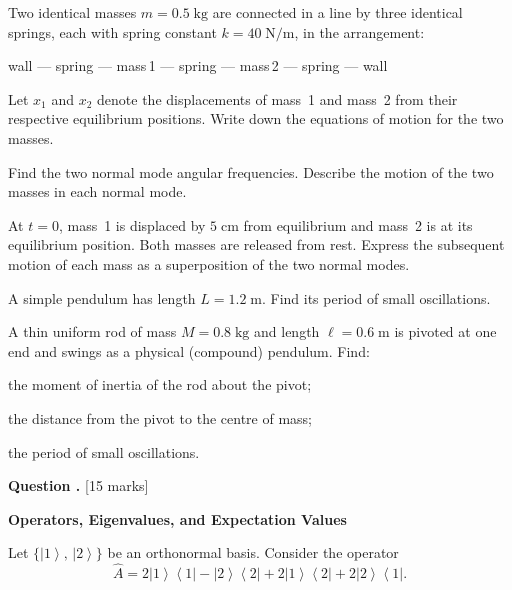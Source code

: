 \documentclass[12pt,a4paper]{article}
\newcounter{questioncounter}
\newcommand{\question}[1]{%
  \stepcounter{questioncounter}%
  \vspace{0.5cm}%
  \noindent\textbf{Question \thequestioncounter.} \hfill [#1 marks]%
  \vspace{0.2cm}%
  \par%
}
\renewcommand{\ket}[1]{\left|#1\right\rangle}
\renewcommand{\ketbra}[2]{\left|#1\right\rangle\!\left\langle #2\right|}
\begin{document}
\begin{parts}
\item Two identical masses $m = 0.5\;\text{kg}$ are connected in a line by three identical springs, each with spring constant $k = 40\;\text{N/m}$, in the arrangement:

\begin{center}
wall --- spring --- mass\,1 --- spring --- mass\,2 --- spring --- wall
\end{center}

Let $x_1$ and $x_2$ denote the displacements of mass~1 and mass~2 from their respective equilibrium positions. Write down the equations of motion for the two masses. 

\item Find the two normal mode angular frequencies. Describe the motion of the two masses in each normal mode. 

\item At $t = 0$, mass~1 is displaced by $5\;\text{cm}$ from equilibrium and mass~2 is at its equilibrium position. Both masses are released from rest. Express the subsequent motion of each mass as a superposition of the two normal modes. 

\item A simple pendulum has length $L = 1.2\;\text{m}$. Find its period of small oscillations. 

\item A thin uniform rod of mass $M = 0.8\;\text{kg}$ and length $\ell = 0.6\;\text{m}$ is pivoted at one end and swings as a physical (compound) pendulum. Find:
\begin{parts}
\item the moment of inertia of the rod about the pivot;
\item the distance from the pivot to the centre of mass;
\item the period of small oscillations.
\end{parts}
\end{parts}

\newpage

\question{15}

\noindent\textbf{Operators, Eigenvalues, and Expectation Values}

\noindent Let $\{\ket{1},\,\ket{2}\}$ be an orthonormal basis. Consider the operator
\[
\hat{A} = 2\ketbra{1}{1} - \ketbra{2}{2} + 2\ketbra{1}{2} + 2\ketbra{2}{1}.
\]
\end{document}
